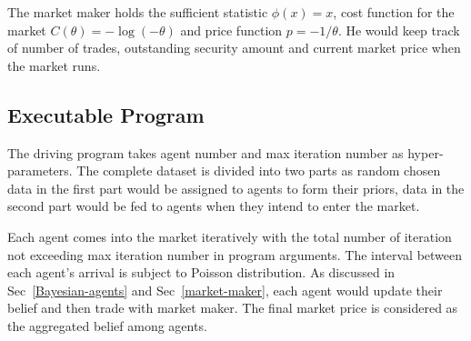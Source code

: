 \documentclass[12pt]{article}
\begin{document}
The market maker holds the sufficient statistic $\phi(x) = x$, cost function for the market $C(\theta) = - \log (- \theta)$ and price function $p = - 1 / \theta$. He would keep track of number of trades, outstanding security amount and current market price when the market runs.

\subsection{Executable Program}\label{main-executable}
The driving program takes agent number and max iteration number as hyper-parameters. The complete dataset is divided into two parts as random chosen data in the first part would be assigned to agents to form their priors, data in the second part would be fed to agents when they intend to enter the market.

Each agent comes into the market iteratively with the total number of iteration not exceeding max iteration number in program arguments. The interval between each agent's arrival is subject to Poisson distribution.  %
As discussed in Sec~\ref{Bayesian-agents} and Sec~\ref{market-maker}, each agent would update their belief and then trade with market maker. The final market price is considered as the aggregated belief among agents.
\end{document}
